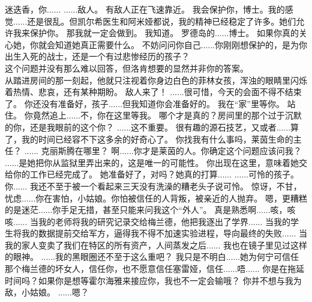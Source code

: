 \documentclass[openany]{book}
\begin{document}
\begin{dialogue}
     迷迭香，你......
     ......敌人。
     有敌人正在飞速靠近。
     我会保护你，博士。我的感觉......还是很乱。但凯尔希医生和阿米娅都说，我的精神已经稳定了许多。她们允许我来保护你。
     那我就一定会做到。
     我知道。
     罗德岛的......博士。
     如果你真的关心她，你就会知道她真正需要什么。
     不妨问问你自己......你刚刚想保护的，是为你出生入死的战士，还是一个有过悲惨经历的孩子？\\
    这个问题并没有那么难以回答，但洛肯想要的显然并非你的答案。\\
    从踏进房间的那一刻起，他就只注视着你身边白色的菲林女孩，浑浊的眼睛里闪烁着热情、悲哀，还有某种期盼。
     敌人来了！
     ......很可惜，今天的会面不得不结束了。
     你还没有准备好，孩子......但我知道你会准备好的。
     我在“家”里等你。
     站住。
     你竟然追上......不，你在这里等我。
     哪个才是真的？房间里的那个过于沉默的你，还是我眼前的这个你？
     ......这不重要。
     很有趣的源石技艺，又或者......算了，我的时间已经容不下这多余的好奇心了。
     你找我有什么事吗，莱茵生命的主任？
     ......
     克丽斯腾在哪里？
     啊......你才是莱茵的人。你确定这个问题应该问我？
     ......是她把你从监狱里弄出来的，这是唯一的可能性。
     你出现在这里，意味着她交给你的工作已经完成了。
     她准备好了，对吗？她真的打算......
     ......可怜的孩子。
     你......
     我还不至于被一个看起来三天没有洗澡的糟老头子说可怜。
     惊讶，不甘，忧虑......你在害怕，小姑娘。你怕被信任的人背叛，被亲近的人抛弃。
     嗯，更糟糕的是迷茫......你手足无措，甚至只能来问我这个“外人”。
     真是熟悉啊......咳，咳咳......
     当我的老师将我的研究记录交给梅兰德，他把我逐出了学界......
     当我的学生将我的数据提前交给军方，逼得我不得不加速实验进程，导向最终的失败......
     当我的家人变卖了我们在特区的所有资产，人间蒸发之后......
     我也在镜子里见过这样的眼神。
     ......我的黑眼圈还不至于这么重吧？
     我只是不明白......她为何宁可信任那个梅兰德的坏女人，信任你，也不愿意信任塞雷娅，信任......唔......
     你是在拖延时间吗？如果你是想等霍尔海雅来接应你，我也不一定会输哦？
     你并不想与我为敌，小姑娘。
     ......嗯？

\end{dialogue}
\end{document}

